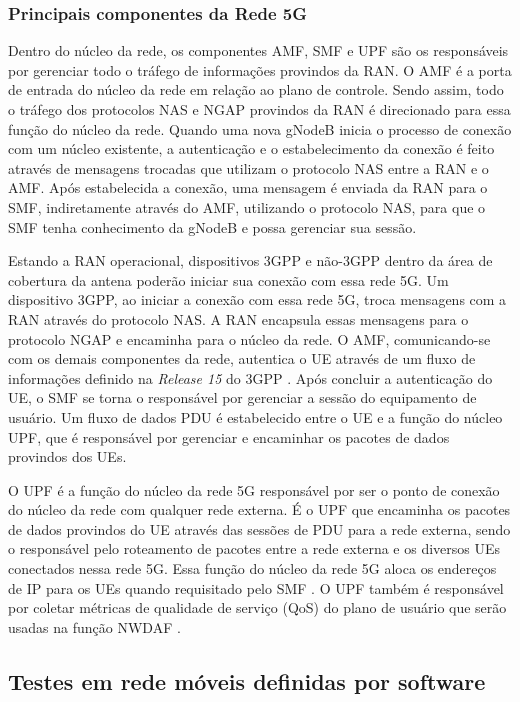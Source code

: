 \subsubsection{Principais componentes da Rede 5G}
\label{subsec:components}

Dentro do núcleo da rede, os componentes AMF, SMF e UPF são os responsáveis por gerenciar todo o tráfego de informações provindos da RAN.
O AMF é a porta de entrada do núcleo da rede em relação ao plano de controle.
Sendo assim, todo o tráfego dos protocolos NAS e NGAP provindos da RAN é direcionado para essa função do núcleo da rede.
Quando uma nova gNodeB inicia o processo de conexão com um núcleo existente, a autenticação e o estabelecimento da conexão é feito através de mensagens trocadas que utilizam o protocolo NAS entre a RAN e o AMF.
Após estabelecida a conexão, uma mensagem é enviada da RAN para o SMF, indiretamente através do AMF, utilizando o protocolo NAS, para que o SMF tenha conhecimento da gNodeB e possa gerenciar sua sessão.

Estando a RAN operacional, dispositivos 3GPP e não-3GPP dentro da área de cobertura da antena poderão iniciar sua conexão com essa rede 5G. Um dispositivo 3GPP, ao iniciar a conexão com essa rede 5G, troca mensagens com a RAN através do protocolo NAS. A RAN encapsula essas mensagens para o protocolo NGAP e encaminha para o núcleo da rede. O AMF, comunicando-se com os demais componentes da rede, autentica o UE através de um fluxo de informações definido na \textit{Release 15} do 3GPP \cite{3gpp.29.509}. Após concluir a autenticação do UE, o SMF se torna o responsável por gerenciar a sessão do equipamento de usuário. Um fluxo de dados PDU é estabelecido entre o UE e a função do núcleo UPF, que é responsável por gerenciar e encaminhar os pacotes de dados provindos dos UEs.

O UPF é a função do núcleo da rede 5G responsável por ser o ponto de conexão do núcleo da rede com qualquer rede externa.
É o UPF que encaminha os pacotes de dados provindos do UE através das sessões de PDU para a rede externa, sendo o responsável pelo roteamento de pacotes entre a rede externa e os diversos UEs conectados nessa rede 5G.
Essa função do núcleo da rede 5G aloca os endereços de IP para os UEs quando requisitado pelo SMF \cite{3gpp.23.501}.
O UPF também é responsável por coletar métricas de qualidade de serviço (QoS) do plano de usuário que serão usadas na função NWDAF \cite{3gpp.23.548}.

\subsection{Testes em rede móveis definidas por software}

